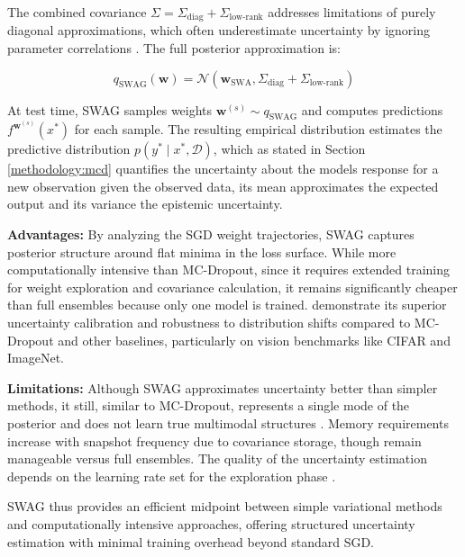 The combined covariance $\Sigma = \Sigma_{\mathrm{diag}} + \Sigma_{\mathrm{low\text{-}rank}}$ addresses
limitations of purely diagonal approximations, which often underestimate uncertainty by ignoring
parameter correlations \citep{maddox2019swag}. The full posterior approximation is:

\[
q_{\mathrm{SWAG}}(\mathbf{w}) = \mathcal{N}\left(\mathbf{w}_\mathrm{SWA}, \Sigma_\mathrm{diag} + \Sigma_\mathrm{low\text{-}rank}\right)
\]

At test time, SWAG samples weights $\mathbf{w}^{(s)} \sim q_{\mathrm{SWAG}}$ and computes predictions
$f^{\mathbf{w}^{(s)}}(x^*)$ for each sample. The resulting empirical distribution estimates the
predictive distribution $p(y^* \mid x^*, \mathcal{D})$, which as stated in Section \ref{methodology:mcd}
quantifies the uncertainty about the models response for a new observation given the observed data, its
mean approximates the expected output and its variance the epistemic uncertainty.

\vspace{0.15cm}
\textbf{Advantages:} By analyzing the SGD weight trajectories, SWAG captures posterior structure around
flat minima in the loss surface. While more computationally intensive than MC-Dropout, since it requires
extended training for weight exploration and covariance calculation, it remains significantly cheaper
than full ensembles because only one model is trained. \citet{maddox2019swag} demonstrate its superior
uncertainty calibration and robustness to distribution shifts compared to MC-Dropout and other
baselines, particularly on vision benchmarks like CIFAR and ImageNet.

\vspace{0.15cm}
\textbf{Limitations:} Although SWAG approximates uncertainty better than simpler methods, it still,
similar to MC-Dropout, represents a single mode of the posterior and does not learn true multimodal
structures \citep{onal2024multiswag}. Memory requirements increase with snapshot frequency due to
covariance storage, though remain manageable versus full ensembles. The quality of the uncertainty
estimation depends on the learning rate set for the exploration phase \citep{maddox2019swag}.

\vspace{0.15cm}
SWAG thus provides an efficient midpoint between simple variational methods and computationally
intensive approaches, offering structured uncertainty estimation with minimal training overhead beyond
standard SGD.
\newpage
